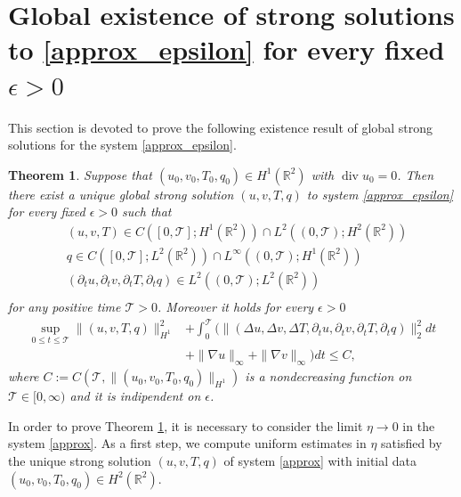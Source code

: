 \documentclass[11pt, a4paper, article,reqno,]{amsart}
\newtheorem{theorem}{Theorem}[section]
\theoremstyle{remark}
\DeclareMathOperator{\dive}{div}
\numberwithin{equation}{section}
\begin{document}
\section{Global existence of strong solutions to \eqref{approx_epsilon} for every fixed $\epsilon>0$}\label{sec:5}

This section is devoted to prove the following existence result of global strong solutions for the system \eqref{approx_epsilon}. 

\begin{theorem}\label{global_existence_thm_1}
   Suppose that $(u_0,v_0,T_{0},q_0) \in H^1(\mathbb{R}^2)$ 
   with $\dive u_0=0$. Then there exist a unique global strong solution $(u,v,T,q)$ to system \eqref{approx_epsilon} for every fixed $\epsilon>0$ such that
   \begin{equation*}
       \begin{aligned}
           & (u,v,T) \in C([0,\mathcal{T}];H^1(\mathbb{R}^2)) \cap L^2((0,\mathcal{T});H^2(\mathbb{R}^2)) \\
           &q \in C([0,\mathcal{T}];L^2(\mathbb{R}^2)) \cap L^\infty((0,\mathcal{T});H^1(\mathbb{R}^2)) \\
           & (\partial_t u, \partial_t v, \partial_t T, \partial_t q) \in L^2((0,\mathcal{T}); L^2(\mathbb{R}^2))\\
       \end{aligned}
   \end{equation*}
   for any positive time $\mathcal{T}>0$. Moreover it holds for every $\epsilon >0$
\begin{equation}\label{ene_uni_epsilon}
     \begin{aligned}
        \sup_{0 \leq t \leq \mathcal{T}}\|(u,v,T, q)\|_{H^1}^2 & + \int_0^\mathcal{T} (\|(\Delta u, \Delta v, \Delta T, \partial_t u, \partial_t v, \partial_t T, \partial_t q)\|_2^2dt\\
        &+ \|\nabla u\|_{\infty} + \|\nabla v\|_{\infty})dt \leq C,
    \end{aligned}
\end{equation}
 where $C:=C(\mathcal{T}, \|(u_0,v_0,T_{0},q_0)\|_{H^1})$ is a nondecreasing function on $\mathcal{T} \in [0,\infty)$ and it is indipendent on $\epsilon$.
\end{theorem}

In order to prove Theorem \ref{global_existence_thm_1}, it is necessary to consider the limit $\eta \to 0$ in the system \eqref{approx}. As a first step, we compute uniform estimates in $\eta$ satisfied by the unique strong solution $(u,v,T,q)$ of system \eqref{approx} with initial data $(u_0,v_0,T_0,q_0) \in H^2(\mathbb{R}^2)$.
\end{document}
